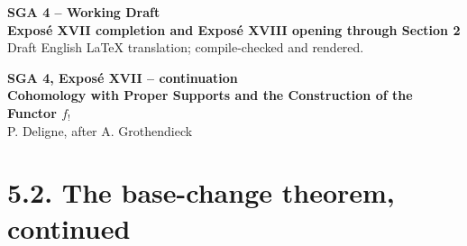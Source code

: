 \documentclass[12pt]{article}
\begin{document}
\begin{center}
{\Large \textbf{SGA 4 -- Working Draft}}\\[0.4em]
{\large \textbf{Expos\'e XVII completion and Expos\'e XVIII opening through Section 2}}\\[0.25em]
{\normalsize Draft English LaTeX translation; compile-checked and rendered.}
\end{center}

\bigskip

\begin{center}
{\Large \textbf{SGA 4, Expos\'e XVII -- continuation}}\\[0.35em]
{\large \textbf{Cohomology with Proper Supports and the Construction of the Functor \(f_!\)}}\\[0.25em]
{\normalsize P. Deligne, after A. Grothendieck}
\end{center}

\bigskip


\section*{5.2. The base-change theorem, continued}
\end{document}

